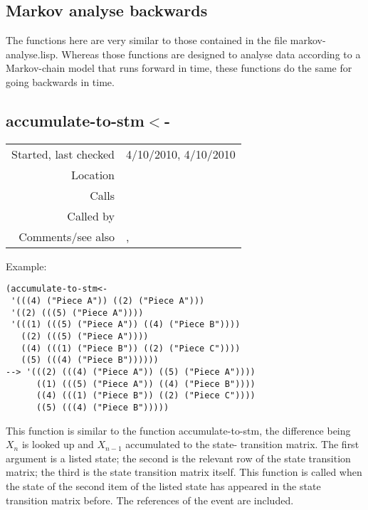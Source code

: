 \subsection{Markov analyse backwards}\label{sec:markov-analyse-backwards}

The functions here are very similar to those contained
in the file markov-analyse.lisp. Whereas those
functions are designed to analyse data according to a
Markov-chain model that runs forward in time, these
functions do the same for going backwards in time.


\subsection*{accumulate-to-stm$<$-}\label{fun:accumulate-to-stm<-}

\vspace{0.3cm}
\begin{tabular}{r|p{8cm}}
Started, last checked & 4/10/2010, 4/10/2010 \\
Location & \nameref{sec:markov-analyse-backwards} \\
Calls & \\
Called by & \nameref{fun:present-to-stm<-} \\
Comments/see also & \nameref{fun:accumulate-to-stm}, \nameref{fun:add-to-stm<-}
\end{tabular}

\vspace{0.5cm}
\noindent Example:
\begin{verbatim}
(accumulate-to-stm<-
 '(((4) ("Piece A")) ((2) ("Piece A")))
 '((2) (((5) ("Piece A"))))
 '(((1) (((5) ("Piece A")) ((4) ("Piece B"))))
   ((2) (((5) ("Piece A"))))
   ((4) (((1) ("Piece B")) ((2) ("Piece C"))))
   ((5) (((4) ("Piece B"))))))
--> '(((2) (((4) ("Piece A")) ((5) ("Piece A"))))
      ((1) (((5) ("Piece A")) ((4) ("Piece B"))))
      ((4) (((1) ("Piece B")) ((2) ("Piece C"))))
      ((5) (((4) ("Piece B")))))
\end{verbatim}

\noindent This function is similar to the function
accumulate-to-stm, the difference being $X_n$ is
looked up and $X_{n-1}$ accumulated to the state-
transition matrix. The first argument is a listed
state; the second is the relevant row of the state
transition matrix; the third is the state transition
matrix itself. This function is called when the state
of the second item of the listed state has appeared in
the state transition matrix before. The references of
the event are included.


